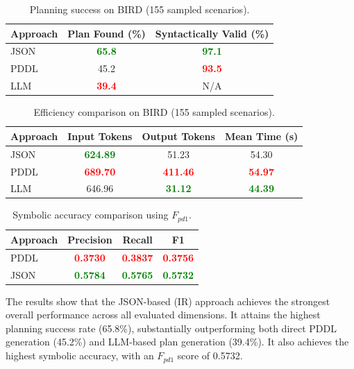 \documentclass[12pt]{extarticle}
\begin{document}
\begin{table}[H]
\centering
\small
\caption{Planning success on BIRD (155 sampled scenarios).}
\label{tab:planning-performance}
\begin{tabular}{lcc}
\toprule
\textbf{Approach} & \textbf{Plan Found (\%)} & \textbf{Syntactically Valid (\%)} \\
\midrule
JSON & \textbf{\textcolor{green}{65.8}} & \textbf{\textcolor{green}{97.1}} \\
PDDL & 45.2 & \textbf{\textcolor{red}{93.5}} \\
LLM & \textbf{\textcolor{red}{39.4}} & N/A \\
\bottomrule
\end{tabular}
\end{table}

\begin{table}[H]
\centering
\small
\caption{Efficiency comparison on BIRD (155 sampled scenarios).}
\label{tab:planning-efficiency}
\begin{tabular}{lccc}
\toprule
\textbf{Approach} & \textbf{Input Tokens} & \textbf{Output Tokens} & \textbf{Mean Time (s)} \\
\midrule
JSON & \textbf{\textcolor{green}{624.89}} & 51.23 & 54.30 \\
PDDL & \textbf{\textcolor{red}{689.70}} & \textbf{\textcolor{red}{411.46}} & \textbf{\textcolor{red}{54.97}} \\
LLM & 646.96 & \textbf{\textcolor{green}{31.12}} & \textbf{\textcolor{green}{44.39}} \\
\bottomrule
\end{tabular}
\end{table}

\begin{table}[H]
\centering
\caption{Symbolic accuracy comparison using $F_{pd1}$.}
\label{tab:planning-f1-results}
\begin{tabular}{lccc}
\toprule
\textbf{Approach} & \textbf{Precision} & \textbf{Recall} & \textbf{F1} \\
\midrule
PDDL & \textbf{\textcolor{red}{0.3730}} & \textbf{\textcolor{red}{0.3837}} & \textbf{\textcolor{red}{0.3756}} \\
JSON & \textbf{\textcolor{green}{0.5784}} & \textbf{\textcolor{green}{0.5765}} & \textbf{\textcolor{green}{0.5732}} \\
\bottomrule
\end{tabular}
\end{table}

The results show that the JSON-based (IR) approach achieves the strongest overall performance across all evaluated dimensions. It attains the highest planning success rate (65.8\%), substantially outperforming both direct PDDL generation (45.2\%) and LLM-based plan generation (39.4\%). It also achieves the highest symbolic accuracy, with an $F_{pd1}$ score of 0.5732.
\end{document}
